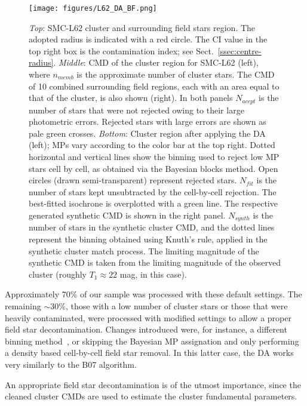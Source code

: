 \documentclass{aa}
\begin{document}
\begin{figure}
\centering
\texttt{[image: figures/L62\_DA\_BF.png]}
\caption{\emph{Top}: SMC-L62 cluster and surrounding field stars
region. The adopted radius is indicated with a red circle. The CI value in the
top right box is the contamination index; see Sect.~\ref{ssec:centre-radius}.
%
\emph{Middle}: CMD of the cluster region for SMC-L62 (left),
where $n_{memb}$ is the approximate number of cluster stars. The CMD
of 10 combined surrounding field regions, each with an area equal to
that of the cluster, is also shown (right).
In both panels $N_{accpt}$ is the number of stars that were not rejected owing to
their large photometric errors. Rejected stars with large errors are shown as
pale green crosses.
%
\emph{Bottom}: Cluster region after applying the DA (left); MPs vary
according to the color bar at the top right. Dotted horizontal and vertical lines
show the binning used to reject low MP stars cell by cell, as obtained via the
Bayesian blocks method. Open circles (drawn semi-transparent) represent rejected
stars.
$N_{fit}$ is the number of stars kept unsubtracted by the cell-by-cell
rejection. The best-fitted isochrone is overplotted with a green line. 
The respective generated synthetic CMD is shown in the right panel. $N_{synth}$
is the number of stars in the synthetic cluster CMD, and the dotted lines
represent the binning obtained using Knuth's rule, applied in the synthetic
cluster match process. The limiting magnitude of the synthetic CMD is
taken from the limiting magnitude of the observed cluster (roughly
$T_1{\approx}22$ mag, in this case).}
\label{fig:DA_BF}
\end{figure}

Approximately 70\% of our sample was processed with these default settings.
The remaining ${\sim}$30\%, those with a low number of cluster stars
or those that were heavily contaminated, were processed with modified settings
to allow a proper field star decontamination.
Changes introduced were, for instance, a different binning
method~\citep[often a rectangular grid using the Scott rule;][]{Scott_1979},
or skipping the Bayesian MP assignation and only performing a density based
cell-by-cell field star removal. In this latter case, the DA works very
similarly to the B07 algorithm.

An appropriate field star decontamination is of the utmost importance, since the
cleaned cluster CMDs are used to estimate the cluster fundamental parameters.


\end{document}
